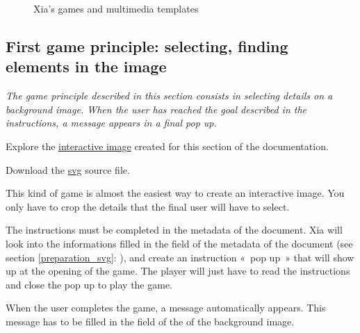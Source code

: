 \begin{figure}[htp]
\caption{Xia's games and multimedia templates}
\label{xia_interface2}
\end{figure}

\subsection{First game principle: selecting, finding elements in the image}\label{game1clicsection}


\textit{The game principle described in this section consists in selecting details 
on a background image. When the user has reached the goal described in the 
instructions, a message appears in a final pop up.}


\begin{links}
Explore the \href{http://xia.dane.ac-versailles.fr/demo/tuto/xia3}{interactive image}
created for this section of the documentation.

Download the \href{http://xia.dane.ac-versailles.fr/demo/tuto/xia3/svg/xia3.svg}{svg} source file.
\end{links}

This kind of game is almost the easiest way to create an interactive image.
You only have to crop the details that the final user will have to select. 

The instructions must be completed in the 
metadata of the document. Xia will look into 
the informations  filled in the  field of the metadata of the document
(see section \ref{preparation_svg}: ), 
and create an instruction «~pop up~» that will show up at the opening of the game. The player 
will just have to read the instructions and close the pop up to play the game.

When the user completes the game, a message automatically appears.
This message has to be filled in the  field of the  of the 
background image. 

